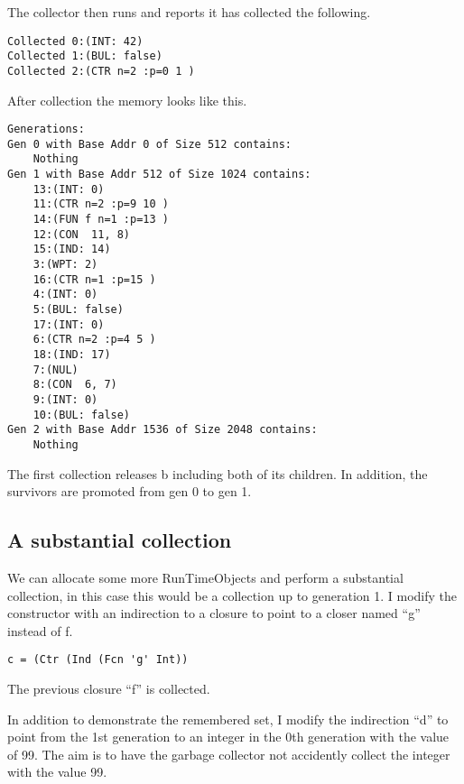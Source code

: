 \documentclass{article}
\begin{document}
The collector then runs and reports it has collected the following.

\begin{verbatim}
Collected 0:(INT: 42)
Collected 1:(BUL: false)
Collected 2:(CTR n=2 :p=0 1 )
\end{verbatim}

 After collection the memory looks like this.

\begin{verbatim}
Generations: 
Gen 0 with Base Addr 0 of Size 512 contains:
    Nothing
Gen 1 with Base Addr 512 of Size 1024 contains:
    13:(INT: 0)
    11:(CTR n=2 :p=9 10 )
    14:(FUN f n=1 :p=13 )
    12:(CON  11, 8)
    15:(IND: 14)
    3:(WPT: 2)
    16:(CTR n=1 :p=15 )
    4:(INT: 0)
    5:(BUL: false)
    17:(INT: 0)
    6:(CTR n=2 :p=4 5 )
    18:(IND: 17)
    7:(NUL)
    8:(CON  6, 7)
    9:(INT: 0)
    10:(BUL: false)
Gen 2 with Base Addr 1536 of Size 2048 contains:
    Nothing
\end{verbatim}

The first collection releases b including both of its children. In addition, the survivors are promoted from gen 0 to gen 1.

\subsection{A substantial collection}

We can allocate some more RunTimeObjects and perform a substantial collection, in this case this would be a collection up to generation 1. I modify the constructor with an indirection to a closure to point to a closer named ``g'' instead of f.

\begin{verbatim}
c = (Ctr (Ind (Fcn 'g' Int))
\end{verbatim}

The previous closure ``f'' is collected.

In addition to demonstrate the remembered set, I modify the indirection ``d'' to point from the 1st generation to an integer in the 0th generation with the value of 99. The aim is to have the garbage collector not accidently collect the integer with the value 99.
\end{document}
